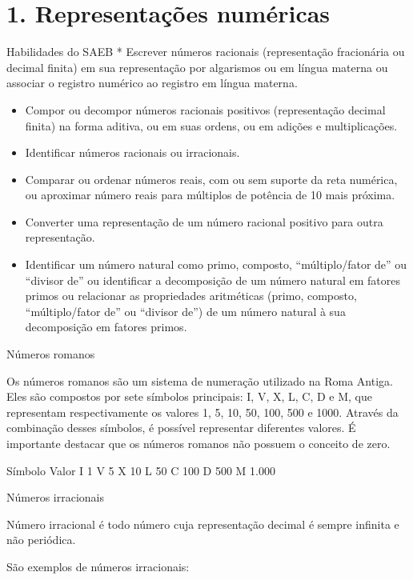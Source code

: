 
\section{1. Representações
numéricas}

Habilidades do SAEB * Escrever números racionais (representação
fracionária ou decimal finita) em sua representação por algarismos ou em
língua materna ou associar o registro numérico ao registro em língua
materna.

\begin{itemize}
\item
  Compor ou decompor números racionais positivos (representação decimal
  finita) na forma aditiva, ou em suas ordens, ou em adições e
  multiplicações.
\item
  Identificar números racionais ou irracionais.
\item
  Comparar ou ordenar números reais, com ou sem suporte da reta
  numérica, ou aproximar número reais para múltiplos de potência de 10
  mais próxima.
\item
  Converter uma representação de um número racional positivo para outra
  representação.
\item
  Identificar um número natural como primo, composto, ``múltiplo/fator
  de'' ou ``divisor de'' ou identificar a decomposição de um número
  natural em fatores primos ou relacionar as propriedades aritméticas
  (primo, composto, ``múltiplo/fator de'' ou ``divisor de'') de um
  número natural à sua decomposição em fatores primos.
\end{itemize}

Números romanos

Os números romanos são um sistema de numeração utilizado na Roma Antiga.
Eles são compostos por sete símbolos principais: I, V, X, L, C, D e M,
que representam respectivamente os valores 1, 5, 10, 50, 100, 500 e
1000. Através da combinação desses símbolos, é possível representar
diferentes valores. É importante destacar que os números romanos não
possuem o conceito de zero.


Símbolo Valor I 1 V 5 X 10 L 50 C 100 D 500 M 1.000

Números irracionais

Número irracional é todo número cuja representação decimal é sempre
infinita e não periódica.

São exemplos de números irracionais:

